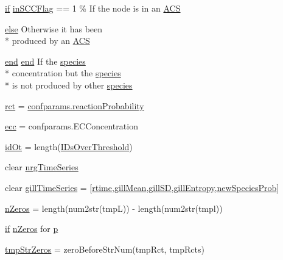 \begin{DoxyCompactItemize}
\item 
\hyperlink{a00030_a01d55766b8058903dd360b4bda71f9f5}{if} \hyperlink{a00028_af1605fa33751cda7e0c840d6df8f8a59}{in\-S\-C\-C\-Flag} == 1 \% If the node is in an \hyperlink{a00028_ad72e1068795c577213481e5db7f3e925}{A\-C\-S}
\item 
\hyperlink{a00031_af5946383720aa572eb93e1e63afc23c2}{else} Otherwise it has been \\*
produced by an \hyperlink{a00028_ad72e1068795c577213481e5db7f3e925}{A\-C\-S}
\item 
\hyperlink{a00025_afb358f48b1646c750fb9da6c6585be2b}{end} \hyperlink{a00025_afb358f48b1646c750fb9da6c6585be2b}{end} If the \hyperlink{a00022}{species} \\*
concentration but the \hyperlink{a00022}{species} \\*
is not produced by other \hyperlink{a00028_ad7a297e3111ffc45eba4a3b88590cb30}{species}
\item 
\hyperlink{a00028_a188d6e4d5a19aaeb1532fc5b9791afba}{rct} = \hyperlink{a00071_a9101beaeb03fddb5c6a9e68442177543}{confparams.\-reaction\-Probability}
\item 
\hyperlink{a00028_a4c229c44edda979d1be7b28b83e5e8b9}{ecc} = confparams.\-E\-C\-Concentration
\item 
\hyperlink{a00028_ad5352b3d09cda91b8c5f90532900abeb}{id\-Ot} = length(\hyperlink{a00028_a67c695f856b6731644c6a128e602a323}{I\-Ds\-Over\-Threshold})
\item 
clear \hyperlink{a00028_ad5f4092827ae220bd7c53532aaaa0590}{nrg\-Time\-Series}
\item 
clear \hyperlink{a00028_ad7c5b4f5873064fed5ce2b70ce073f91}{gill\-Time\-Series} = \mbox{[}\hyperlink{a00028_afc6b38657a313b9f1de2ee356910b6ee}{rtime},\hyperlink{a00028_a7d36858faf2f8bb5963306c86db2b549}{gill\-Mean},\hyperlink{a00028_a187931f510c22818692d094c8026ebd1}{gill\-S\-D},\hyperlink{a00028_aef2e92fdea881fe7819bf51b2d7e0783}{gill\-Entropy},\hyperlink{a00028_aa66147edba72bc0b9cf591cd7475396f}{new\-Species\-Prob}\mbox{]}
\item 
\hyperlink{a00028_ac4353d99277795cadf898255e2c73c71}{n\-Zeros} = length(num2str(tmp\-L)) -\/ length(num2str(tmpl))
\item 
\hyperlink{a00030_a01d55766b8058903dd360b4bda71f9f5}{if} \hyperlink{a00028_ac4353d99277795cadf898255e2c73c71}{n\-Zeros} for \hyperlink{a00028_aa2b4c35904308d35fc5d606a429e608d}{p}
\item 
\hyperlink{a00028_aacf946bee61c4c535a7bf6d85f55f66a}{tmp\-Str\-Zeros} = zero\-Before\-Str\-Num(tmp\-Rct, tmp\-Rcts)

\end{DoxyCompactItemize}
